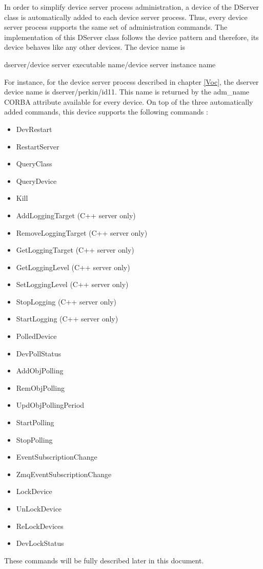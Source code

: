 In order to simplify device server process administration, a device
of the DServer class is automatically added to each
device server process. Thus, every device server process supports
the same set of administration commands. The
implementation of this DServer class follows the device pattern and
therefore, its device behaves like any other devices. The device name
is \begin{center}dserver/device server executable name/device server
instance name\end{center}For instance, for the device server process
described in chapter \ref{Voc}, the dserver device name is dserver/perkin/id11.
This name is returned by the adm\_name CORBA attribute
available for every device. On top of the three automatically added
commands, this device supports the following commands :
\begin{itemize}
\item DevRestart
\item RestartServer
\item QueryClass
\item QueryDevice
\item Kill
\item AddLoggingTarget (C++ server only)
\item RemoveLoggingTarget (C++ server only)
\item GetLoggingTarget (C++ server only)
\item GetLoggingLevel (C++ server only)
\item SetLoggingLevel (C++ server only)
\item StopLogging (C++ server only)
\item StartLogging (C++ server only)
\item PolledDevice
\item DevPollStatus
\item AddObjPolling
\item RemObjPolling
\item UpdObjPollingPeriod
\item StartPolling
\item StopPolling
\item EventSubscriptionChange
\item ZmqEventSubscriptionChange
\item LockDevice
\item UnLockDevice
\item ReLockDevices
\item DevLockStatus
\end{itemize}
These commands will be fully described later in this document.

